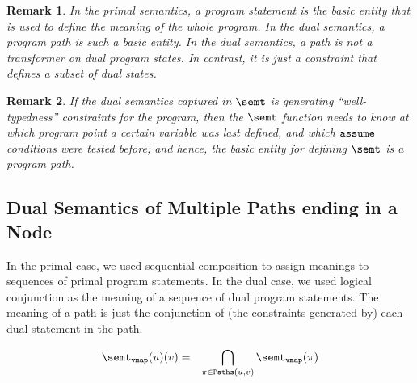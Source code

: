 \documentclass[preprint]{sig-alternate-05-2015}
\newtheorem{remark}{Remark}
\def\vmap{{\tt{vmap}}}
\def\paths{{\tt{Paths}}}
\def\assume{{\tt{assume}}}
\begin{document}
{\begin{remark}
  In the primal semantics, a program statement is the basic entity that is
  used to define the meaning of the whole program.
  In the dual semantics, a program path is such a basic entity.
  In the dual semantics, a path is not a transformer on dual program
  states. In contrast, it is just a {\em{constraint}} that defines a subset of
  dual states. %
\end{remark}

\begin{remark}
If the dual semantics captured in $\semt$
is generating ``well-typedness'' constraints for the
program, then the $\semt$ function needs to know
at which program point a certain variable was last defined,
and which $\assume$ conditions were tested before; and hence,
the basic entity for defining $\semt$ is a program path.
\end{remark}

\subsection{Dual Semantics of Multiple Paths ending in a Node}

In the primal case, %
we used sequential composition to assign meanings to sequences of primal program statements.
In the dual case, %
we used logical conjunction as the meaning of a sequence of dual program statements.
The meaning of a path
is just the conjunction of (the constraints generated by) each dual statement in the path.

\begin{eqnarray}
  \semt_\vmap(u)(v) & = & \bigcap_{\pi\in\paths(u,v)} \semt_\vmap(\pi)
 \label{eqn:dualPath}
\end{eqnarray}


}
\end{document}

